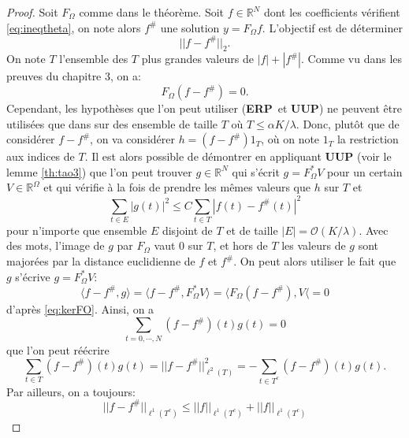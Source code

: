 \begin{proof}
	Soit $F_\Omega$ comme dans le théorème.
	Soit $f \in \mathbb{R}^N$ dont les coefficients vérifient \ref{eq:ineqtheta}, on note alors $f^\#$ une solution $y=F_\Omega f$.
	L'objectif est de déterminer
	\begin{equation}
		||f - f^\#||_2.
	\end{equation}
	On note $T$ l'ensemble des $T$ plus grandes valeurs de $|f| + |f^\#|$.
	Comme vu dans les preuves du chapitre 3, on a:
	\begin{equation}\label{eq:kerFO}
		F_\Omega (f - f^\#) = 0.
	\end{equation}
	Cependant, les hypothèses que l'on peut utiliser (\textbf{ERP} et \textbf{UUP}) ne peuvent être utilisées que dans sur des ensemble de taille $T$ où $T\leq \alpha K /\lambda$.
	Donc, plutôt que de considérer $f-f^\#$, on va considérer $h = (f-f^\#) 1_T$, où on note $1_T$ la restriction aux indices de $T$.
	Il est alors possible de démontrer en appliquant \textbf{UUP} (voir le lemme \ref{th:tao3}) que l'on peut trouver $g \in \mathbb{R}^N$ qui s'écrit $g = F_\Omega^* V$ pour un certain $V \in \mathbb{R}^\Omega$ et qui vérifie à la fois de prendre les mêmes valeurs que $h$ sur $T$ et
	\begin{equation}\label{eq:ineqgf}
		\sum_{t \in E} |g(t)|^2 \leq C \sum_{t\in T} |f(t) - f^\#(t)|^2
	\end{equation}
	pour n'importe que ensemble $E$ disjoint de $T$ et de taille $|E| = \mathcal{O}(K/\lambda)$.
	Avec des mots, l'image de $g$ par $F_{\Omega}$ vaut 0 sur $T$, et hors de $T$ les valeurs de $g$ sont majorées par la distance euclidienne de $f$ et $f^\#$.
	On peut alors utiliser le fait que $g$ s'écrive $g=F_\Omega^* V$:
	\begin{equation}
		\langle f-f^\#, g \rangle = \langle f-f^\#, F_\Omega^* V\rangle = \langle F_\Omega(f-f^\#), V \langle = 0
	\end{equation}
	d'après \ref{eq:kerFO}.
	Ainsi, on a 
	\begin{equation}
		\sum_{t=0,\cdots, N} (f - f^\#)(t) g(t) = 0
	\end{equation}
	que l'on peut réécrire
	\begin{equation}\label{eq:ineqfg}
		\sum_{t\in T} (f - f^\#)(t) g(t) = ||f-f^\#||_{\ell^2(T)}^2 = - \sum_{t\in T^c} (f - f^\#)(t) g(t).
	\end{equation}
	Par ailleurs, on a toujours:
	\begin{equation}
		||f-f^\#||_{\ell^1(T^c)} \leq ||f||_{\ell^1(T^c)} + ||f||_{\ell^1(T^c)}

\end{equation}
\end{proof}
